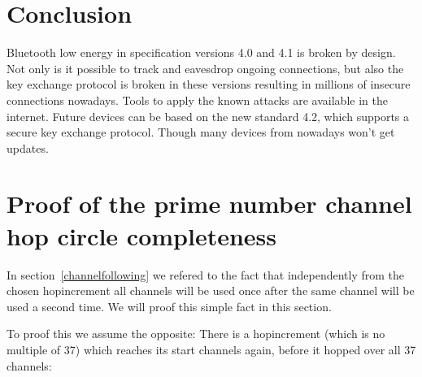 \documentclass[conference]{IEEEtran}
\begin{document}
\section{Conclusion}
Bluetooth low energy in specification versions 4.0 and 4.1 is broken by design. Not only is it possible to track and eavesdrop ongoing connections, but also the key exchange protocol is broken in these versions resulting in millions of insecure connections nowadays. Tools to apply the known attacks are available in the internet. Future devices can be based on the new standard 4.2, which supports a secure key exchange protocol. Though many devices from nowadays won't get updates.



%


\appendices
\section{Proof of the prime number channel hop circle completeness}

In section~\ref{channelfollowing} we refered to the fact that independently from the chosen hopincrement all channels will be used once after the same channel will be used a second time. We will proof this simple fact in this section.

To proof this we assume the opposite: There is a hopincrement (which is no multiple of 37) which reaches its start channels again, before it hopped over all 37 channels:
\end{document}
